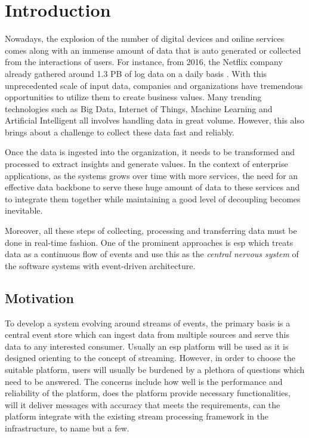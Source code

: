 \chapter{Introduction} \label{chap:intro}
Nowadays, the explosion of the number of digital devices and online services comes along with an immense amount of data that is auto generated or collected from the interactions of users. For instance, from 2016, the Netflix company already gathered around 1.3 PB of log data on a daily basis \cite{netflixpipeline}. With this unprecedented scale of input data, companies and organizations have tremendous opportunities to utilize them to create business values. Many trending technologies such as Big Data, Internet of Things, Machine Learning and Artificial Intelligent all involves handling data in great volume. However, this also brings about a challenge to collect these data fast and reliably.
 

Once the data is ingested into the organization, it needs to be transformed  and processed to extract insights and generate values. In the context of enterprise applications, as the systems grows over time with more services, the need for an effective data backbone to serve these huge amount of data to these services and to integrate them together while maintaining a good level of decoupling becomes inevitable.

Moreover, all these steps of collecting, processing and transferring data must be done in real-time fashion. One of the prominent approaches is \acrfull{esp} which treats data as a continuous flow of events and use this as the \emph{central nervous system} of the software systems with event-driven architecture.
 
\section{Motivation}
To develop a system evolving around streams of events, the primary basis is a central event store which can ingest data from multiple sources and serve this data to any interested consumer. Usually an \acrshort{esp} platform will be used as it is designed orienting to the concept of streaming. However, in order to choose the suitable platform, users will usually be burdened by a plethora of questions which need to be answered. The concerns include how well is the performance and reliability of the platform, does the platform provide necessary functionalities, will it deliver messages with accuracy that meets the requirements, can the platform integrate with the existing stream processing framework in the infrastructure, to name but a few.


